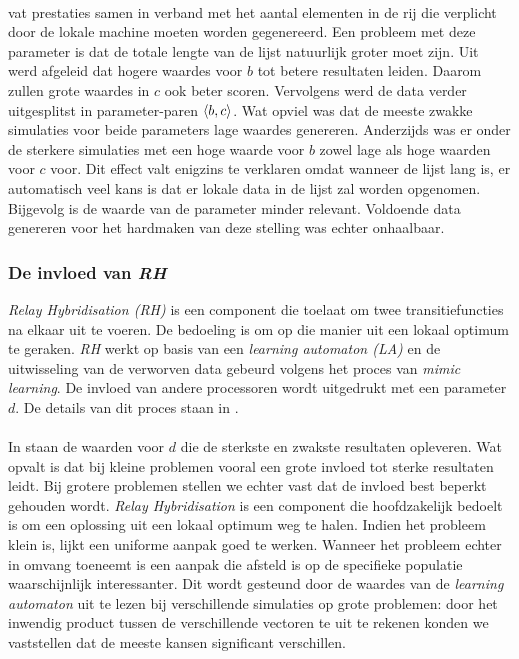 \paragraph{}
 vat prestaties samen in verband met het aantal elementen in de rij die verplicht door de lokale machine moeten worden gegenereerd. Een probleem met deze parameter is dat de totale lengte van de lijst natuurlijk groter moet zijn. Uit  werd afgeleid dat hogere waardes voor $b$ tot betere resultaten leiden. Daarom zullen grote waardes in $c$ ook beter scoren. Vervolgens werd de data verder uitgesplitst in parameter-paren $\left\langle b,c\right\rangle$. Wat opviel was dat de meeste zwakke simulaties voor beide parameters lage waardes genereren. Anderzijds was er onder de sterkere simulaties met een hoge waarde voor $b$ zowel lage als hoge waarden voor $c$ voor. Dit effect valt enigzins te verklaren omdat wanneer de lijst lang is, er automatisch veel kans is dat er lokale data in de lijst zal worden opgenomen. Bijgevolg is de waarde van de parameter minder relevant. Voldoende data genereren voor het hardmaken van deze stelling was echter onhaalbaar.


\subsubsection{De invloed van \emph{RH}}

\emph{Relay Hybridisation (RH)} is een component die toelaat om twee transitiefuncties na elkaar uit te voeren. De bedoeling is om op die manier uit een lokaal optimum te geraken. \emph{RH} werkt op basis van een \emph{learning automaton (LA)} en de uitwisseling van de verworven data gebeurd volgens het proces van \emph{mimic learning}. De invloed van andere processoren wordt uitgedrukt met een parameter $d$. De details van dit proces staan in .


\paragraph{}
In  staan de waarden voor $d$ die de sterkste en zwakste resultaten opleveren. Wat opvalt is dat bij kleine problemen vooral een grote invloed tot sterke resultaten leidt. Bij grotere problemen stellen we echter vast dat de invloed best beperkt gehouden wordt. \emph{Relay Hybridisation} is een component die hoofdzakelijk bedoelt is om een oplossing uit een lokaal optimum weg te halen. Indien het probleem klein is, lijkt een uniforme aanpak goed te werken. Wanneer het probleem echter in omvang toeneemt is een aanpak die afsteld is op de specifieke populatie waarschijnlijk interessanter. Dit wordt gesteund door de waardes van de \emph{learning automaton} uit te lezen bij verschillende simulaties op grote problemen: door het inwendig product tussen de verschillende vectoren te uit te rekenen konden we vaststellen dat de meeste kansen significant verschillen.

